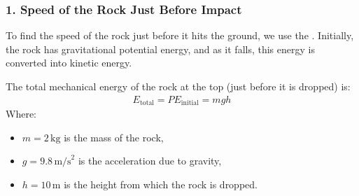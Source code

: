 \documentclass[letterpaper,10pt,english]{jupyterBook}
\begin{document}
\subsubsection{1. Speed of the Rock Just Before Impact}
\label{\detokenize{prerequisites:speed-of-the-rock-just-before-impact}}
\sphinxAtStartPar
To find the speed of the rock just before it hits the ground, we use the . Initially, the rock has gravitational potential energy, and as it falls, this energy is converted into kinetic energy.

\sphinxAtStartPar
The total mechanical energy of the rock at the top (just before it is dropped) is:
\begin{equation*}
\begin{split}
E_\text{total} = PE_\text{initial} = mgh
\end{split}
\end{equation*}
\sphinxAtStartPar
Where:
\begin{itemize}
\item {} 
\sphinxAtStartPar
\(m = 2 \, \text{kg}\) is the mass of the rock,

\item {} 
\sphinxAtStartPar
\(g = 9.8 \, \text{m/s}^2\) is the acceleration due to gravity,

\item {} 
\sphinxAtStartPar
\(h = 10 \, \text{m}\) is the height from which the rock is dropped.

\end{itemize}
\end{document}
